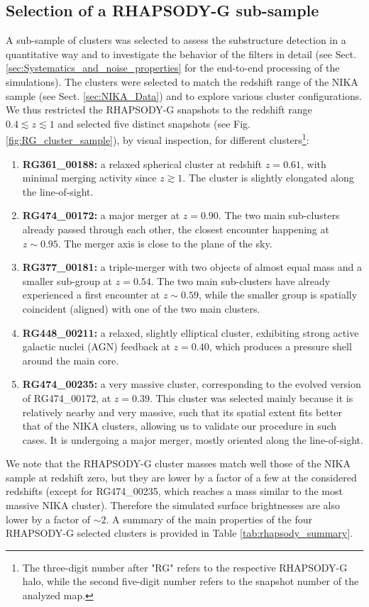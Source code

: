 \documentclass[traditabstract]{aa}
\begin{document}
\subsection{Selection of a RHAPSODY-G sub-sample}\label{sec:Selection_of_a_RHAPSODY-G_sub-sample}
A sub-sample of clusters was selected to assess the substructure detection in a quantitative way and to investigate the behavior of the filters in detail (see Sect. \ref{sec:Systematics_and_noise_properties} for the end-to-end processing of the simulations). The clusters were selected to match the redshift range of the NIKA sample (see Sect. \ref{sec:NIKA_Data}) and to explore various cluster configurations. We thus restricted the RHAPSODY-G snapshots to the redshift range $0.4 \lesssim z \lesssim 1$ and selected five distinct snapshots (see Fig. \ref{fig:RG_cluster_sample}), by visual inspection, for different clusters\footnote{The three-digit number after "RG" refers to the respective RHAPSODY-G halo, while the second five-digit number refers to the snapshot number of the analyzed map.}:
\begin{enumerate}
\item {\bf RG361\_00188:} a relaxed spherical cluster at redshift $z = 0.61$, with minimal merging activity since $z \gtrsim 1$. The cluster is slightly elongated along the line-of-sight.
\item {\bf RG474\_00172:} a major merger at $z = 0.90$. The two main sub-clusters already passed through each other, the closest encounter happening at $z \sim 0.95$. The merger axis is close to the plane of the sky. 
\item {\bf RG377\_00181:} a triple-merger with two objects of almost equal mass and a smaller sub-group at $z = 0.54$. The two main sub-clusters have already experienced a first encounter at $z \sim 0.59$, while the smaller group is spatially coincident (aligned) with one of the two main clusters.
\item {\bf RG448\_00211:} a relaxed, slightly elliptical cluster, exhibiting strong active galactic nuclei (AGN) feedback at $z = 0.40$, which produces a pressure shell around the main core.
\item {\bf RG474\_00235:} a very massive cluster, corresponding to the evolved version of RG474\_00172, at $z = 0.39$. This cluster was selected mainly because it is relatively nearby and very massive, such that its spatial extent fits better that of the NIKA clusters, allowing us to validate our procedure in such cases. It is undergoing a major merger, mostly oriented along the line-of-sight.
\end{enumerate}
We note that the RHAPSODY-G cluster masses match well those of the NIKA sample at redshift zero, but they are lower by a factor of a few at the considered redshifts (except for RG474\_00235, which reaches a mass similar to the most massive NIKA cluster). Therefore the simulated surface brightnesses are also lower by a factor of $\sim 2$. A summary of the main properties of the four RHAPSODY-G selected clusters is provided in Table \ref{tab:rhapsody_summary}.
\end{document}
